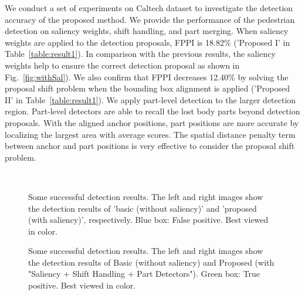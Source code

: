 \documentclass[journal]{IEEEtran}
\begin{document}
We conduct a set of experiments on Caltech dataset to investigate the detection accuracy of the proposed method. We provide the performance of the pedestrian detection on saliency weights, shift handling, and part merging. When saliency weights are applied to the detection proposals, FPPI is 18.82\% ('Proposed I' in Table~\ref{table:result1}). In comparison with the previous results, the saliency weights help to ensure the correct detection proposal as shown in Fig.~\ref{fig:withSal}). We also confirm that FPPI decreases 12.40\% by solving the proposal shift problem when the bounding box alignment is applied ('Proposed II' in Table~\ref{table:result1}). We apply part-level detection to the larger detection region. Part-level detectors are able to recall the lost body parts beyond detection proposals. With the aligned anchor positions, part positions are more accurate by localizing the largest area with average scores. The spatial distance penalty term between anchor and part positions is very effective to consider the proposal shift problem.

 \begin{figure}[t]
\centering
{} \quad
{}\\
\quad
{}
\caption{Some successful detection results. The left and right images show the detection results of 'basic (without saliency)' and 'proposed (with saliency)', respectively. Blue box: False positive. Best viewed in color.}
\label{fig:result3}
\end{figure}

\begin{figure}[t]
\centering
{} \quad
{}
\caption{Some successful detection results. The left and right images show the detection results of Basic (without saliency) and Proposed (with "Saliency + Shift Handling + Part Detectors"). Green box: True positive. Best viewed in color.}
\label{fig:result2}
\end{figure}
\end{document}
